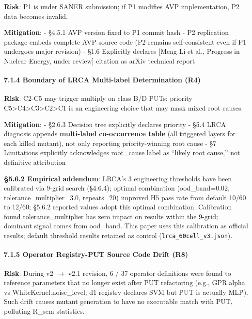 \documentclass[review,12pt,authoryear]{elsarticle}
\begin{document}
\textbf{Risk}: P1 is under SANER submission; if P1 modifies AVP
implementation, P2 data becomes invalid.

\textbf{Mitigation}: - §4.5.1 AVP version fixed to P1 commit hash - P2
replication package embeds complete AVP source code (P2 remains
self-consistent even if P1 undergoes major revision) - §1.6 Explicitly
declares {[}Meng Li et al., Progress in Nuclear Energy, under review{]}
citation as arXiv technical report

\paragraph{7.1.4 Boundary of LRCA Multi-label Determination
(R4)}\label{boundary-of-lrca-multi-label-determination-r4}

\textbf{Risk}: C2-C5 may trigger multiply on class B/D PUTs; priority
C5\textgreater C4\textgreater C3\textgreater C2\textgreater C1 is an
engineering choice that may mask mixed root causes.

\textbf{Mitigation}: - §2.6.3 Decision tree explicitly declares priority
- §5.4 LRCA diagnosis appends \textbf{multi-label co-occurrence table}
(all triggered layers for each killed mutant), not only reporting
priority-winning root cause - §7 Limitations explicitly acknowledges
root\_cause label as ``likely root cause,'' not definitive attribution

\textbf{§5.6.2 Empirical addendum}: LRCA's 3 engineering thresholds have
been calibrated via 9-grid search (§4.6.4); optimal combination
(ood\_band=0.02, tolerance\_multiplier=3.0, repeats=20) improved H5 pass
rate from default 10/60 to 12/60; §5.6.2 reported values adopt this
optimal combination. Calibration found tolerance\_multiplier has zero
impact on results within the 9-grid; dominant signal comes from
ood\_band. This paper uses this calibration as official results; default
threshold results retained as control (\texttt{lrca\_60cell\_v3.json}).

\paragraph{7.1.5 Operator Registry-PUT Source Code Drift
(R8)}\label{operator-registry-put-source-code-drift-r8}

\textbf{Risk}: During v2 $\to$ v2.1 revision, 6 / 37 operator definitions
were found to reference parameters that no longer exist after PUT
refactoring (e.g., GPR.alpha vs WhiteKernel.noise\_level; d1 registry
declares SVM but PUT is actually MLP). Such drift causes mutant
generation to have no executable match with PUT, polluting R\_sem
statistics.
\end{document}
